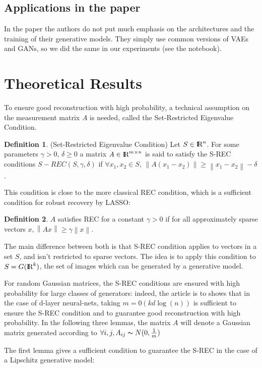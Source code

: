 \documentclass{article}
\newcommand\norm[1]{\left\lVert#1\right\rVert}
\def\R{\textrm{I\kern-0.21emR}}
\theoremstyle{definition}
\newtheorem{definition}{Definition}[section]
\theoremstyle{lemma}
\theoremstyle{theorem}
\begin{document}
\subsection{Applications in the paper}
In the paper the authors do not put much emphasis on the architectures and the training of their generative models. They simply use common versions of VAEs and GANs, so we did the same in our experiments (see the notebook).

\newpage
\section{Theoretical Results}
To ensure good reconstruction with high probability, a technical assumption on the measurement matrix $A$ is needed, called the Set-Restricted Eigenvalue Condition.

\begin{definition} (Set-Restricted Eigenvalue Condition)
Let $S \in \R^n$. For some parameters $\gamma > 0$, $\delta \geq 0$ a matrix $A \in \R^{m \times n}$ is said to satisfy the S-REC conditions $S-REC(S,\gamma,\delta)$ if $\forall x_1, x_2 \in S$, 
$\norm{A(x_1 - x_2)} \geq \norm{x_1 - x_2} - \delta$.
\end{definition}

This condition is close to the more classical REC condition, which is a sufficient condition for robust recovery by LASSO:

\begin{definition}
$A$ satisfies REC for a constant $\gamma >0$ if for all approximately sparse vectors $x, \norm{Ax} \geq \gamma \norm{x}$.
\end{definition}

The main difference between both is that S-REC condition applies to vectors in a set $S$, and isn't restricted to sparse vectors. The idea is to apply this condition to $S = G(\R^k)$, the set of images which can be generated by a generative model. 


For random Gaussian matrices, the S-REC conditions are ensured with high probability for large classes of generators: indeed, the article is to shows that in the case of d-layer neural-nets, taking $m=0(kd\log(n))$ is sufficient to ensure the S-REC condition and to guarantee good reconstruction with high probability. In the following three lemmas, the matrix $A$ will denote a Gaussian matrix generated according to $\forall i,j, A_{ij} \thicksim N(0, \frac{1}{m})$ 


The first lemma gives a sufficient condition to guarantee the S-REC in the case of a Lipschitz generative model:
\end{document}
